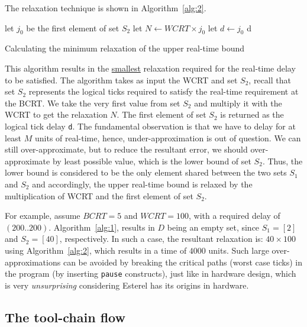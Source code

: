The relaxation technique is shown in Algorithm~\ref{alg:2}.
  
\begin{algorithm}[t!]
  \begin{minipage}{1.0\linewidth}
    \SetAlgoLined
     {
      let $j_{0}$ be the first element of set $S_2$\;
      \ShowLn let $N \leftarrow WCRT \times j_0$\;
      let $d \leftarrow j_0$\;
    }
    \Return d\;
    \caption{Calculating the minimum relaxation of the upper real-time
      bound}
    \label{alg:2}
  \end{minipage}
\end{algorithm}


This algorithm results in the \underline{smallest} relaxation required
for the real-time delay to be satisfied. The algorithm takes as input
the WCRT and set $S_2$, recall that set $S_2$ represents the logical
ticks required to satisfy the real-time requirement at the BCRT. We take
the very first value from set $S_2$ and multiply it with the WCRT to get
the relaxation $N$. The first element of set $S_2$ is returned as the
logical tick delay \texttt{d}. The fundamental observation is that we
have to delay for at least $M$ units of real-time, hence,
under-approximation is out of question. We can still over-approximate,
but to reduce the resultant error, we should over-approximate by least
possible value, which is the lower bound of set $S_2$. Thus, the lower
bound is considered to be the only element shared between the two sets
$S_1$ and $S_2$ and accordingly, the upper real-time bound is relaxed by
the multiplication of WCRT and the first element of set $S_2$.

For example, assume $BCRT=5$ and $WCRT=100$, with a required delay of
$(200..200)$. Algorithm~\ref{alg:1}, results in $D$ being an empty set,
since $S_1=[2]$ and $S_2=[40]$, respectively. In such a case, the
resultant relaxation is: $40 \times 100$ using Algorithm~\ref{alg:2},
which results in a time of $4000$ units. Such large over-approximations
can be avoided by breaking the critical paths (worst case ticks) in the
program (by inserting \texttt{pause} constructs), just like in hardware
design, which is very \textit{unsurprising} considering Esterel has its
origins in hardware.

\subsection{The tool-chain flow}
\label{sec:tool-chain-flow}

